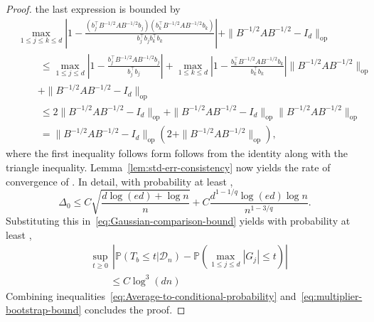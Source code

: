 \documentclass{article}
\begin{document}
\begin{appendices}
\begin{proof}
the last expression is bounded by
\begin{align*}
&
\max_{1\le j \le k\le d}\left|1 - \frac{(b_j^{\top}B^{-1/2}AB^{-1/2}b_j)(b_k^{\top}B^{-1/2}AB^{-1/2}b_k)}{b_j^{\top}b_jb_k^{\top}b_k}\right| + \|B^{-1/2}AB^{-1/2} - I_d\|_{\mathrm{op}}\\ &\qquad~ \le \max_{1\le j\le d}\left|1 - \frac{b_j^{\top}B^{-1/2}AB^{-1/2}b_j}{b_j^{\top}b_j}\right| + \max_{1\le k\le d}\left|1 - \frac{b_k^{\top}B^{-1/2}AB^{-1/2}b_k}{b_k^{\top}b_k}\right|\|B^{-1/2}AB^{-1/2}\|_{\mathrm{op}}\\ &\qquad+ \|B^{-1/2}AB^{-1/2} - I_d\|_{\mathrm{op}}\\ &\qquad~ \le 2\|B^{-1/2}AB^{-1/2} - I_d\|_{\mathrm{op}} + \|B^{-1/2}AB^{-1/2} - I_d\|_{\mathrm{op}}\|B^{-1/2}AB^{-1/2}\|_{\mathrm{op}}\\ &\qquad~ = \|B^{-1/2}AB^{-1/2} - I_d\|_{\mathrm{op}}\left(2 + \|B^{-1/2}AB^{-1/2}\|_{\mathrm{op}}\right),
\end{align*}
where the first inequality follows form follows from the identity   along with the triangle inequality.
Lemma~\ref{lem:std-err-consistency} now yields the rate of convergence of  . In detail,
with probability at least  ,
\begin{equation}\label{eq:multiplier-bootstrap-bound-1}
\Delta_0 \le C\sqrt{\frac{d\log(ed) + \log n}{n}} + C\frac{d^{1-1/q}\log(ed)\log n}{n^{1-3/q}}.
\end{equation}
Substituting this in~\eqref{eq:Gaussian-comparison-bound} yields with probability at least  ,
\begin{equation}\label{eq:multiplier-bootstrap-bound}
\begin{split}
&\sup_{t\ge 0}\,\left|\mathbb{P}(T_b \le t\big|\mathcal{D}_n) - \mathbb{P}\left(\max_{1\le j\le d}|G_j| \le t\right)\right|\\ &\qquad\le C\log^3(dn)\left.
\end{split}
\end{equation}
Combining inequalities~\eqref{eq:Average-to-conditional-probability} and~\eqref{eq:multiplier-bootstrap-bound} concludes the proof.
\end{proof}
\end{appendices}


\newpage
\end{document}
